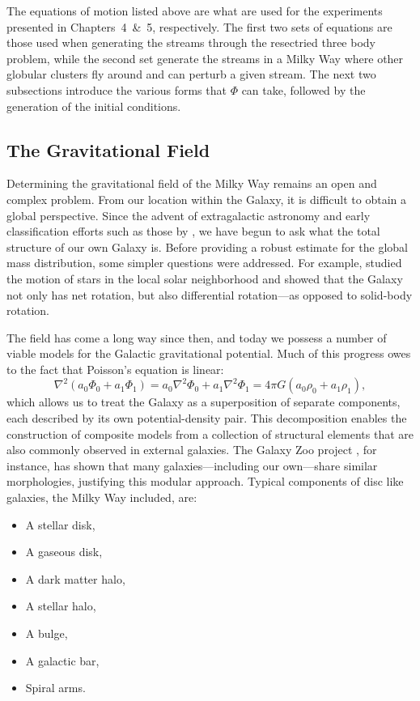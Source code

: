         The equations of motion listed above are what are used for the experiments presented in Chapters~4~\&~5, respectively. The first two sets of equations are those used when generating the streams through the resectried three body problem, while the second set generate the streams in a Milky Way where other globular clusters fly around and can perturb a given stream. The next two subsections introduce the various forms that $\Phi$ can take, followed by the generation of the initial conditions. 


    \subsection{The Gravitational Field} \label{subsec:gravfield}
        Determining the gravitational field of the Milky Way remains an open and complex problem. From our location within the Galaxy, it is difficult to obtain a global perspective. Since the advent of extragalactic astronomy and early classification efforts such as those by \citet{1926ApJ....64..321H}, we have begun to ask what the total structure of our own Galaxy is. Before providing a robust estimate for the global mass distribution, some simpler questions were addressed. For example, \citet{1927BAN.....4...91O} studied the motion of stars in the local solar neighborhood and showed that the Galaxy not only has net rotation, but also differential rotation—as opposed to solid-body rotation.

        The field has come a long way since then, and today we possess a number of viable models for the Galactic gravitational potential. Much of this progress owes to the fact that Poisson's equation is linear:
        \begin{equation}\label{eq:linear_poisson}
            \nabla^2 \left(a_0\Phi_0 + a_1\Phi_1 \right) = a_0 \nabla^2 \Phi_0 + a_1 \nabla^2 \Phi_1 = 4\pi G \left(a_0\rho_0 +a_1\rho_1\right),
        \end{equation}
        which allows us to treat the Galaxy as a superposition of separate components, each described by its own potential-density pair. This decomposition enables the construction of composite models from a collection of structural elements that are also commonly observed in external galaxies. The Galaxy Zoo project \citep{2008MNRAS.389.1179L}, for instance, has shown that many galaxies—including our own—share similar morphologies, justifying this modular approach. Typical components of disc like galaxies, the Milky Way included, are:
        \begin{itemize}
            \item A stellar disk,
            \item A gaseous disk,
            \item A dark matter halo,
            \item A stellar halo,
            \item A bulge,
            \item A galactic bar,
            \item Spiral arms.
        \end{itemize}

